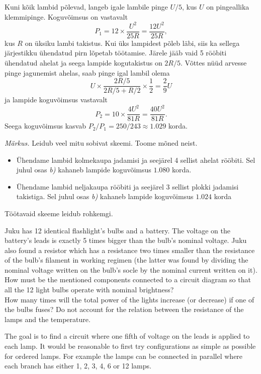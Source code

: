 Kuni kõik lambid põlevad, langeb igale lambile pinge $U/5$, kus $U$ on pingeallika klemmipinge. Koguvõimsus on vastavalt
\[
P_1=12\times \frac{U^2}{25R}=\frac{12U^2}{25R},
\]
kus $R$ on üksiku lambi takistus. Kui üks lampidest põleb läbi, siis ka sellega järjestikku ühendatud pirn lõpetab töötamise. Järele jääb vaid 5 rööbiti ühendatud ahelat ja seega lampide kogutakistus on $2R/5$. Võttes nüüd arvesse pinge jagunemist ahelas, saab pinge igal lambil olema
\[
U\times \frac{2R/5}{2R/5+R/2} \times \frac{1}{2}=\frac{2}{9}U
\]
ja lampide koguvõimsus vastavalt
\[
P_2=10\times \frac{4U^2}{81R}=\frac{40U^2}{81R}.
\]
Seega koguvõimsus kasvab $P_2/P_1=250/243\approx \num{1.029}$ korda.

\textit{Märkus.} Leidub veel mitu sobivat skeemi. Toome mõned neist.
\begin{itemize} 
\item
Ühendame lambid kolmekaupa jadamisi ja seejärel 4 sellist ahelat rööbiti. Sel juhul osas \textit{b)} kahaneb lampide koguvõimsus $\num{1.080}$ korda.
\item
Ühendame lambid neljakaupa rööbiti ja seejärel 3 sellist plokki jadamisi takistiga. Sel juhul osas \textit{b)} kahaneb lampide koguvõimsus $\num{1.024}$ korda
\end{itemize}
Töötavaid skeeme leidub rohkemgi.

Juku has 12 identical flashlight’s bulbs and a battery. The voltage on the battery’s leads is exactly 5 times bigger than the bulb’s nominal voltage. Juku also found a resistor which has a resistance two times smaller than the resistance of the bulb’s filament in working regimen (the latter was found by dividing the nominal voltage written on the bulb’s socle by the nominal current written on it).\\
\osa How must be the mentioned components connected to a circuit diagram so that all the 12 light bulbs operate with nominal brightness?\\
\osa How many times will the total power of the lights increase (or decrease) if one of the bulbs fuses? Do not account for the relation between the resistance of the lamps and the temperature.

\hinteng
The goal is to find a circuit where one fifth of voltage on the leads is applied to each lamp. It would be reasonable to first try configurations as simple as possible for ordered lamps. For example the lamps can be connected in parallel where each branch has either 1, 2, 3, 4, 6 or 12 lamps.

